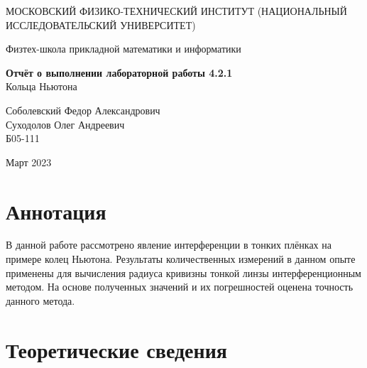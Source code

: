 \documentclass[a4paper,12pt]{article} %
\date{\today}
\begin{document}
\begin{titlepage}
	\begin{center}
		{\large МОСКОВСКИЙ ФИЗИКО-ТЕХНИЧЕСКИЙ ИНСТИТУТ (НАЦИОНАЛЬНЫЙ ИССЛЕДОВАТЕЛЬСКИЙ УНИВЕРСИТЕТ)}
	\end{center}
	\begin{center}
		{\large Физтех-школа прикладной математики и информатики}
	\end{center}
	
	
	\vspace{4.5cm}
	{\huge
		\begin{center}
			{\bf Отчёт о выполнении лабораторной работы 4.2.1}\\
			Кольца Ньютона
		\end{center}
	}
	\vspace{1cm}
	\begin{center}
		{\large Соболевский Федор Александрович \\
                    Суходолов Олег Андреевич \\
			\vspace{0.2cm}
			Б05-111}
	\end{center}
	\vspace{8cm}
	\begin{center}
		Март 2023
	\end{center}
\end{titlepage}

\section{Аннотация}

В данной работе рассмотрено явление интерференции в тонких плёнках на примере колец Ньютона. Результаты количественных измерений в данном опыте применены для вычисления радиуса кривизны тонкой линзы интерференционным методом. На основе полученных значений и их погрешностей оценена точность данного метода.

\section{Теоретические сведения}
\end{document}
